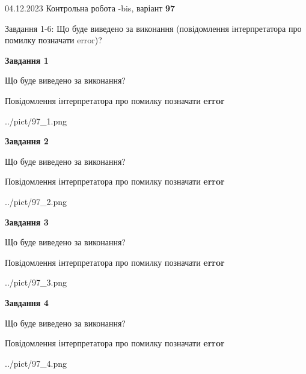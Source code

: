 \documentclass[12pt, ukrainian]{article}
\begin{document}
{{04.12.2023 Контрольна робота -bis, варіант  \No \textbf { 97 }\par}}
{

Завдання 1-6: Що буде виведено за виконання (повідомлення інтерпретатора про помилку позначати error)?


{\begin {center}\textbf{Завдання 1}\end {center}}\par
Що буде виведено за виконання? \par
Повідомлення інтерпретатора про помилку позначати \textbf{error}

\begin{center}
	{../pict/97_1.png}
\end{center}
\newpage

{\begin {center}\textbf{Завдання 2}\end {center}}\par
Що буде виведено за виконання? \par
Повідомлення інтерпретатора про помилку позначати \textbf{error}

\begin{center}
	{../pict/97_2.png}
\end{center}
\newpage

{\begin {center}\textbf{Завдання 3}\end {center}}\par
Що буде виведено за виконання? \par
Повідомлення інтерпретатора про помилку позначати \textbf{error}

\begin{center}
	{../pict/97_3.png}
\end{center}
\newpage

{\begin {center}\textbf{Завдання 4}\end {center}}\par
Що буде виведено за виконання? \par
Повідомлення інтерпретатора про помилку позначати \textbf{error}

\begin{center}
	{../pict/97_4.png}
\end{center}
\newpage

}
\end{document}
